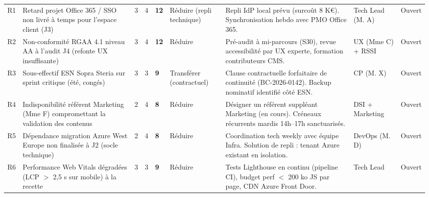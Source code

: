 \documentclass[11pt,a4paper,oneside]{report}
\begin{document}
\begin{landscape}
\renewcommand{\arraystretch}{1.4}
\begin{tabularx}{\linewidth}{C{0.5cm} L{3.5cm} C{0.7cm} C{0.7cm} C{0.8cm} L{2.8cm} L{4cm} C{2.2cm} C{1.6cm}}
\toprule
{}
\th{\#} &  &  &  &  &  &  &  &  \\
\midrule

R1 & Retard projet Office 365 / SSO non livré à temps pour l'espace client (J3)
   & 3 & 4 & \textbf{12}
   & Réduire (repli technique)
   & Repli IdP local prévu (surcoût 8 K€). Synchronisation hebdo avec PMO Office 365.
   & Tech Lead (M. A) & Ouvert \\

R2 & Non-conformité RGAA 4.1 niveau AA à l'audit J4 (refonte UX insuffisante)
   & 3 & 4 & \textbf{12}
   & Réduire
   & Pré-audit à mi-parcours (S30), revue accessibilité par UX experte, formation contributeurs CMS.
   & UX (Mme C) + RSSI & Ouvert \\

R3 & Sous-effectif ESN Sopra Steria sur sprint critique (été, congés)
   & 3 & 3 & \textbf{9}
   & Transférer (contractuel)
   & Clause contractuelle forfaitaire de continuité (BC-2026-0142). Backup nominatif identifié côté ESN.
   & CP (M. X) & Ouvert \\

R4 & Indisponibilité référent Marketing (Mme F) compromettant la validation des contenus
   & 2 & 4 & \textbf{8}
   & Réduire
   & Désigner un référent suppléant Marketing (en cours). Créneaux récurrents mardis 14h--17h sanctuarisés.
   & DSI + Marketing & Ouvert \\

R5 & Dépendance migration Azure West Europe non finalisée à J2 (socle technique)
   & 2 & 4 & \textbf{8}
   & Réduire
   & Coordination tech weekly avec équipe Infra. Solution de repli : tenant Azure existant en isolation.
   & DevOps (M. D) & Ouvert \\

R6 & Performance Web Vitals dégradées (LCP $>$ 2{,}5 s sur mobile) à la recette
   & 3 & 3 & \textbf{9}
   & Réduire
   & Tests Lighthouse en continu (pipeline CI), budget perf $<$ 200 ko JS par page, CDN Azure Front Door.
   & Tech Lead & Ouvert \\


\end{tabularx}
\end{landscape}
\end{document}
